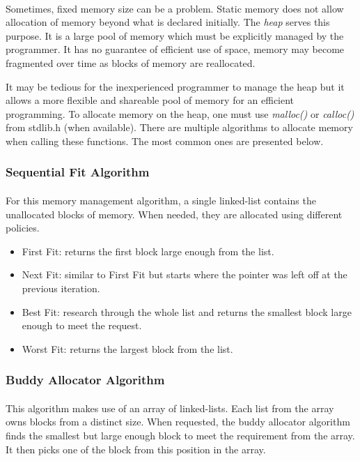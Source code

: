 \paragraph{}
Sometimes, fixed memory size can be a problem.
Static memory does not allow allocation of memory beyond what is declared initially.
The \textit{heap} serves this purpose.
It is a large pool of memory which must be explicitly managed by the programmer.
It has no guarantee of efficient use of space, memory may become fragmented over time as blocks of memory are reallocated.

It may be tedious for the inexperienced programmer to manage the heap
    but it allows a more flexible and shareable pool of memory for an efficient programming.
To allocate memory on the heap, one must use \textit{malloc()} or \textit{calloc()} from stdlib.h (when available).
There are multiple algorithms to allocate memory when calling these functions.
The most common ones are presented below.

\subsubsection{Sequential Fit Algorithm}
\paragraph{}
For this memory management algorithm, a single linked-list contains the unallocated blocks of memory.
When needed, they are allocated using different policies.
\begin{itemize}
    \item First Fit: returns the first block large enough from the list.
    \item Next Fit: similar to First Fit but starts where the pointer was left off at the previous iteration.
    \item Best Fit: research through the whole list and returns the smallest block large enough to meet the request.
    \item Worst Fit: returns the largest block from the list.
\end{itemize}

\subsubsection{Buddy Allocator Algorithm}
\paragraph{}
This algorithm makes use of an array of linked-lists.
Each list from the array owns blocks from a distinct size.
When requested, the buddy allocator algorithm finds the smallest but large enough block to meet the requirement from the array.
It then picks one of the block from this position in the array.

